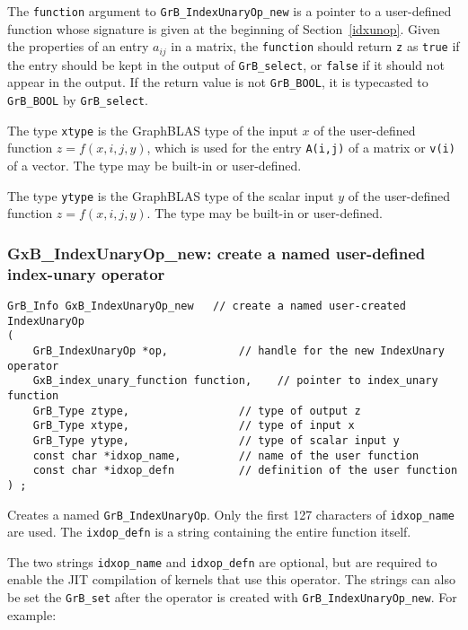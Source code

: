 \documentclass[12pt]{article}
\begin{document}
The \verb'function' argument to \verb'GrB_IndexUnaryOp_new' is a pointer to a
user-defined function whose signature is given at the beginning of
Section~\ref{idxunop}.  Given the properties of an entry $a_{ij}$ in a
matrix, the \verb'function' should return \verb'z' as \verb'true' if the entry
should be kept in the output of \verb'GrB_select', or \verb'false' if it should
not appear in the output.  If the return value is not \verb'GrB_BOOL',
it is typecasted to \verb'GrB_BOOL' by \verb'GrB_select'.

The type \verb'xtype' is the GraphBLAS type of the input $x$ of the
user-defined function $z=f(x,i,j,y)$, which is used for the
entry \verb'A(i,j)' of a matrix or \verb'v(i)' of a vector.  The type may be
built-in or user-defined.

The type \verb'ytype' is the GraphBLAS type of the scalar input $y$ of the
user-defined function $z=f(x,i,j,y)$.  The type may be built-in
or user-defined.

\newpage
\subsubsection{{\sf GxB\_IndexUnaryOp\_new:} create a named user-defined index-unary operator}
\label{idxunop_new_named}

\begin{mdframed}[userdefinedwidth=6in]
{\footnotesize
\begin{verbatim}
GrB_Info GxB_IndexUnaryOp_new   // create a named user-created IndexUnaryOp
(
    GrB_IndexUnaryOp *op,           // handle for the new IndexUnary operator
    GxB_index_unary_function function,    // pointer to index_unary function
    GrB_Type ztype,                 // type of output z
    GrB_Type xtype,                 // type of input x
    GrB_Type ytype,                 // type of scalar input y
    const char *idxop_name,         // name of the user function
    const char *idxop_defn          // definition of the user function
) ;
\end{verbatim} }\end{mdframed}

Creates a named \verb'GrB_IndexUnaryOp'.  Only the first 127 characters of
\verb'idxop_name' are used.  The \verb'ixdop_defn' is a string containing the
entire function itself.

The two strings \verb'idxop_name' and \verb'idxop_defn' are optional, but are
required to enable the JIT compilation of kernels that use this operator.
The strings can also be set the \verb'GrB_set' after the operator is created
with \verb'GrB_IndexUnaryOp_new'.  For example:
\end{document}
